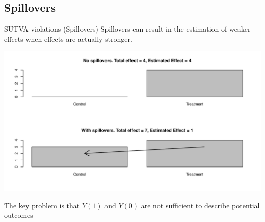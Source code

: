\documentclass[
  11pt,
  ignorenonframetext,
]{beamer}
\begin{document}
\hypertarget{spillovers}{%
\subsection{\texorpdfstring{Spillovers\label{SUTVA}}{Spillovers}}\label{spillovers}}

\begin{frame}{SUTVA violations (Spillovers)}
\protect\hypertarget{sutva-violations-spillovers}{}
\scriptsize Spillovers can result in the estimation of weaker effects
when effects are actually stronger.

\includegraphics{0_lectures_files/figure-beamer/unnamed-chunk-517-1.pdf}

\scriptsize The key problem is that \(Y(1)\) and \(Y(0)\) are not
sufficient to describe potential outcomes
\end{frame}
\end{document}
